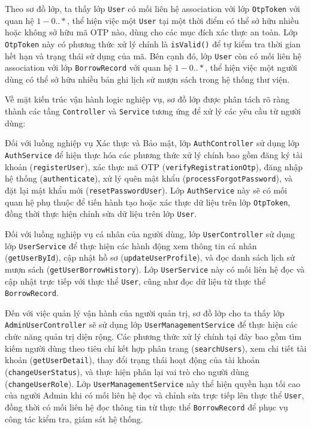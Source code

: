 Theo sơ đồ lớp, ta thấy lớp \texttt{User} có mối liên hệ association với lớp \texttt{OtpToken} với quan hệ $1 - 0..*$, thể hiện việc một \texttt{User} tại một thời điểm có thể sở hữu nhiều hoặc không sở hữu mã OTP nào, dùng cho các mục đích xác thực an toàn. Lớp \texttt{OtpToken} này có phương thức xử lý chính là \texttt{isValid()} để tự kiểm tra thời gian hết hạn và trạng thái sử dụng của mã. Bên cạnh đó, lớp \texttt{User} còn có mối liên hệ association với lớp \texttt{BorrowRecord} với quan hệ $1 - 0..*$, thể hiện việc một người dùng có thể sở hữu nhiều bản ghi lịch sử mượn sách trong hệ thống thư viện.

Về mặt kiến trúc vận hành logic nghiệp vụ, sơ đồ lớp được phân tách rõ ràng thành các tầng \texttt{Controller} và \texttt{Service} tương ứng để xử lý các yêu cầu từ người dùng:

Đối với luồng nghiệp vụ Xác thực và Bảo mật, lớp \texttt{AuthController} sử dụng lớp \texttt{AuthService} để hiện thực hóa các phương thức xử lý chính bao gồm đăng ký tài khoản (\texttt{registerUser}), xác thực mã OTP (\texttt{verifyRegistrationOtp}), đăng nhập hệ thống (\texttt{authenticate}), xử lý quên mật khẩu (\texttt{processForgotPassword}), và đặt lại mật khẩu mới (\texttt{resetPasswordUser}). Lớp \texttt{AuthService} này sẽ có mối quan hệ phụ thuộc để tiến hành tạo hoặc xác thực dữ liệu trên lớp \texttt{OtpToken}, đồng thời thực hiện chỉnh sửa dữ liệu trên lớp \texttt{User}.

Đối với luồng nghiệp vụ cá nhân của người dùng, lớp \texttt{UserController} sử dụng lớp \texttt{UserService} để thực hiện các hành động xem thông tin cá nhân (\texttt{getUserById}), cập nhật hồ sơ (\texttt{updateUserProfile}), và đọc danh sách lịch sử mượn sách (\texttt{getUserBorrowHistory}). Lớp \texttt{UserService} này có mối liên hệ đọc và cập nhật trực tiếp với thực thể \texttt{User}, cũng như đọc dữ liệu từ thực thể \texttt{BorrowRecord}.

Đến với việc quản lý vận hành của người quản trị, sơ đồ lớp cho ta thấy lớp \texttt{AdminUserController} sẽ sử dụng lớp \texttt{UserManagementService} để thực hiện các chức năng quản trị diện rộng. Các phương thức xử lý chính tại đây bao gồm tìm kiếm người dùng theo tiêu chí kết hợp phân trang (\texttt{searchUsers}), xem chi tiết tài khoản (\texttt{getUserDetail}), thay đổi trạng thái hoạt động của tài khoản (\texttt{changeUserStatus}), và thực hiện phân lại vai trò cho người dùng (\texttt{changeUserRole}). Lớp \texttt{UserManagementService} này thể hiện quyền hạn tối cao của người Admin khi có mối liên hệ đọc và chỉnh sửa trực tiếp lên thực thể \texttt{User}, đồng thời có mối liên hệ đọc thông tin từ thực thể \texttt{BorrowRecord} để phục vụ công tác kiểm tra, giám sát hệ thống.

